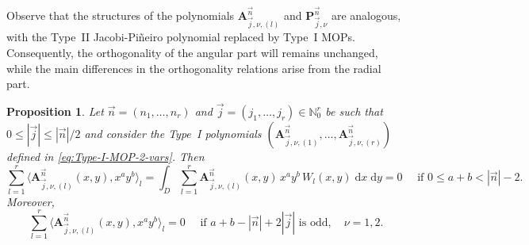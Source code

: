 \documentclass[a4paper]{article}
\theoremstyle{plain}
\newtheorem{proposition}[theorem]{Proposition}
\theoremstyle{definition}
\newcommand{\NN}{\mathbb{N}}
\newcommand{\dxdy}{\;\mathrm{d} x\;\mathrm{d} y}
\begin{document}
    Observe that the structures of the polynomials $\mathbf A_{\vec j,\nu,(l)}^{\vec n}$ and $\mathbf P_{\vec j,\nu}^{\vec n}$ are analogous, with the Type~II Jacobi-Pi\~neiro polynomial replaced by Type~I MOPs. Consequently, the orthogonality of the angular part will remains unchanged, while the main differences in the orthogonality relations arise from the radial part. 

    
    \begin{proposition}\label{prop:Type-I-MOP-orthogonality}
        Let $\vec n = (n_1,\dots,n_r)$ and $ \vec j = (j_1,\dots,j_r)\in\NN_0^r$ be such that $0\leq |\vec j| \leq |\vec n|/2$ and consider the Type~I polynomials $\left(\mathbf A_{\vec j,\nu,(1)}^{\vec n}, \dots, \mathbf A_{\vec j,\nu,(r)}^{\vec n}\right)$  defined in \eqref{eq:Type-I-MOP-2-vars}. Then
        \begin{equation}
            \sum_{l=1}^r\langle  \mathbf A_{\vec j,\nu,(l)}^{\vec n}(x,y) , x^a y^b\rangle_l=  \int_D \sum_{l=1}^r \mathbf A_{\vec j,\nu,(l)}^{\vec n}(x,y) \, x^a y^b \, W_l(x,y) \dxdy =0 \quad \text{ if }  0\leq a+b< |\vec n|-2 .
        \end{equation}
        Moreover,
        $$
        \sum_{l=1}^r\langle  \mathbf A_{\vec j,\nu,(l)}^{\vec n}(x,y) , x^a y^b\rangle_l=  0 \quad\text{ if } a+b-|\vec n|+2|\vec j|\text{ is odd}, \quad \nu=1,2.
        $$
    \end{proposition}
    
\end{document}
